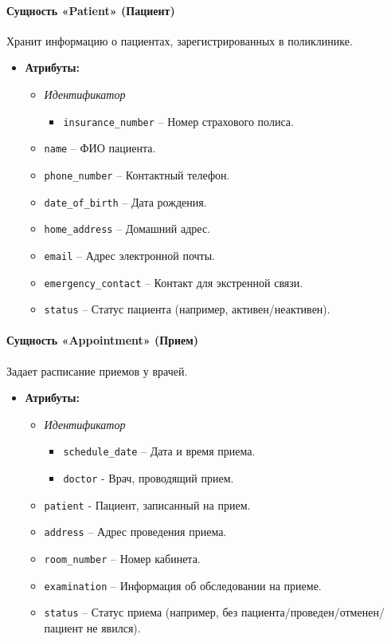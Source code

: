 \documentclass[a4paper, 14pt]{extarticle}
\begin{document}
\paragraph{Сущность «Patient» (Пациент)}
Хранит информацию о пациентах, зарегистрированных в поликлинике.
\begin{itemize}
    \item \textbf{Атрибуты:}
    \begin{itemize}
        \item \textit{Идентификатор}
            \begin{itemize}
                \item \texttt{insurance\_number} – Номер страхового полиса.
            \end{itemize}

        \item \texttt{name} – ФИО пациента.
        \item \texttt{phone\_number} – Контактный телефон.
        \item \texttt{date\_of\_birth} – Дата рождения.
        \item \texttt{home\_address} – Домашний адрес.
        \item \texttt{email} – Адрес электронной почты.
        \item \texttt{emergency\_contact} – Контакт для экстренной связи.
        \item \texttt{status} – Статус пациента (например, активен/неактивен).
    \end{itemize}
\end{itemize}

\paragraph{Сущность «Appointment» (Прием)}
Задает расписание приемов у врачей.
\begin{itemize}
    \item \textbf{Атрибуты:}
    \begin{itemize}
        \item \textit{Идентификатор}
            \begin{itemize}
                \item \texttt{schedule\_date} – Дата и время приема.
                \item \texttt{doctor} - Врач, проводящий прием.
            \end{itemize}
        \item \texttt{patient} - Пациент, записанный на прием.
        \item \texttt{address} – Адрес проведения приема.
        \item \texttt{room\_number} – Номер кабинета.
        \item \texttt{examination} – Информация об обследовании на приеме.
        \item \texttt{status} – Статус приема (например, без пациента/проведен/отменен/пациент не явился).
    \end{itemize}
\end{itemize}
\end{document}
